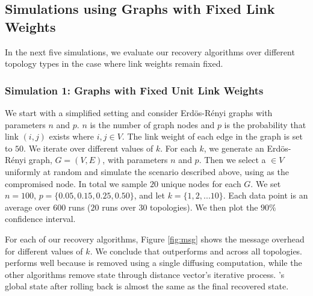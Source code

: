 \subsection{Simulations using Graphs with Fixed Link Weights}
\label{subsec:fixed}

In the next five simulations, we evaluate our recovery algorithms over different topology types in the case where link weights remain fixed.

\subsubsection{Simulation 1: \er Graphs with Fixed Unit Link Weights}
\label{subsubsec:expt1}

We start with a simplified setting and consider 
Erd\"{o}s-R\'enyi graphs with parameters $n$ and $p$. 
$n$ is the number of graph nodes and $p$ is the probability that link $(i,j)$ exists where $i,j \in V$.
The link weight of each edge in the graph is set to $50$.
We iterate over different values of $k$. For each $k$, we 
generate an Erd\"{o}s-R\'enyi graph, $G = (V,E)$, with parameters $n$ and $p$. Then we select a \bad $\in V$ uniformly at random and simulate the scenario described above, 
using \bad as the compromised node. In total we sample $20$ unique nodes for each $G$.
We set $n=100$, $p=\{0.05,0.15,0.25, 0.50\}$, and let $k=\{1,2,
... 10\}$. Each data point is an average over $600$ runs ($20$ runs over 
$30$ topologies).  We then plot the $90 \%$ confidence interval.

For each of our recovery algorithms, Figure \ref{fig:msg} shows the
message overhead for different values of $k$. %
We conclude that \cpr outperforms \purge and \second across all topologies. \cpr performs well because \badvector is removed using a single diffusing computation,  
while the other algorithms remove \badvector state through distance vector's iterative process.
\cprs's global state after rolling back is almost the same as the final recovered state.

